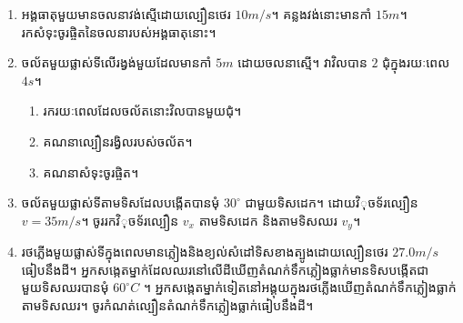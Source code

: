 \begin{enumerate}[m]
\begin{figure}[H]
			\end{figure}
		\item អង្គធាតុមួយមានចលនាវង់ស្មើដោយល្បឿនថេរ $10m/s$។ គន្លងវង់នោះមានកាំ $15m$។\\ រកសំទុះចូរផ្ចិតនៃចលនារបស់អង្គធាតុនោះ។
		\item ចល័តមួយផ្លាស់ទីលើរង្វង់មួយដែលមានកាំ $5m$ ដោយចលនាស្មើ។ វាវិលបាន $2$ ជុំក្នុងរយៈពេល $4s$។
		\begin{enumerate}[k]
			\item រករយៈពេលដែលចល័តនោះវិលបានមួយជុំ។
			\item គណនាល្បឿនរង្វិលរបស់ចល័ត។
			\item គណនាសំទុះចូរផ្ចិត។
		\end{enumerate}
		\item ចល័តមួយផ្លាស់ទីតាមទិសដែលបង្កើតបានមុំ $30^\circ$ ជាមួយទិសដេក។ ដោយវិុចទ័រល្បឿន $v=35m/s$។ ចូររកវិុចទ័រល្បឿន $v_x$ តាមទិសដេក និងតាមទិសឈរ $v_y$។
		\item រថភ្លើងមួយផ្លាស់ទីក្នុងពេលមានភ្លៀងនិងខ្យល់សំដៅទិសខាងត្បូងដោយល្បឿនថេរ $27.0m/s$ ធៀបនឹងដី។ អ្នកសង្កេតម្នាក់ដែលឈរនៅលើដីឃើញតំណក់ទឹកភ្លៀងធ្លាក់មានទិសបង្កើតជាមួយទិសឈរបានមុំ $60^\circ C$ ។ អ្នកសង្កេតម្នាក់ទៀតនៅអង្គុយក្នុងរថភ្លើងឃើញតំណក់ទឹកភ្លៀងធ្លាក់តាមទិសឈរ។ ចូរកំណត់ល្បឿនតំណក់ទឹកភ្លៀងធ្លាក់ធៀបនឹងដី។
	\end{enumerate}